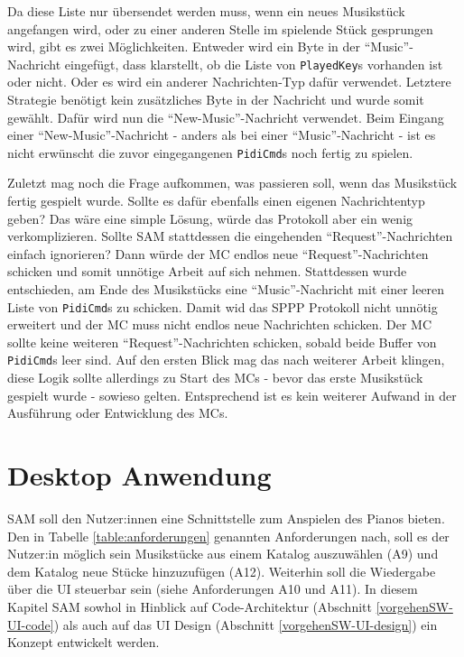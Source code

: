 Da diese Liste nur übersendet werden muss, wenn ein neues Musikstück angefangen wird, oder zu einer anderen Stelle im spielende Stück gesprungen wird, gibt es zwei Möglichkeiten.
Entweder wird ein Byte in der \enquote{Music}-Nachricht eingefügt, dass klarstellt, ob die Liste von \lstinline|PlayedKey|s vorhanden ist oder nicht.
Oder es wird ein anderer Nachrichten-Typ dafür verwendet.
Letztere Strategie benötigt kein zusätzliches Byte in der Nachricht und wurde somit gewählt.
Dafür wird nun die \enquote{New-Music}-Nachricht verwendet.
Beim Eingang einer \enquote{New-Music}-Nachricht - anders als bei einer \enquote{Music}-Nachricht - ist es nicht erwünscht die zuvor eingegangenen \lstinline|PidiCmd|s noch fertig zu spielen.

Zuletzt mag noch die Frage aufkommen, was passieren soll, wenn das Musikstück fertig gespielt wurde.
Sollte es dafür ebenfalls einen eigenen Nachrichtentyp geben?
Das wäre eine simple Lösung, würde das Protokoll aber ein wenig verkomplizieren.
Sollte \ac{SAM} stattdessen die eingehenden \enquote{Request}-Nachrichten einfach ignorieren?
Dann würde der \ac{MC} endlos neue \enquote{Request}-Nachrichten schicken und somit unnötige Arbeit auf sich nehmen.
Stattdessen wurde entschieden, am Ende des Musikstücks eine \enquote{Music}-Nachricht mit einer leeren Liste von \lstinline|PidiCmd|s zu schicken.
Damit wid das \ac{SPPP} Protokoll nicht unnötig erweitert und der \ac{MC} muss nicht endlos neue Nachrichten schicken.
Der \ac{MC} sollte keine weiteren \enquote{Request}-Nachrichten schicken, sobald beide Buffer von \lstinline|PidiCmd|s leer sind.
Auf den ersten Blick mag das nach weiterer Arbeit klingen, diese Logik sollte allerdings zu Start des \ac{MC}s - bevor das erste Musikstück gespielt wurde - sowieso gelten.
Entsprechend ist es kein weiterer Aufwand in der Ausführung oder Entwicklung des \ac{MC}s.



\section{Desktop Anwendung} \label{vorgehenSW-UI}

\ac{SAM} soll den Nutzer:innen eine Schnittstelle zum Anspielen des Pianos bieten.
Den in Tabelle \ref{table:anforderungen} genannten Anforderungen nach, soll es der Nutzer:in möglich sein Musikstücke aus einem Katalog auszuwählen (A9) und dem Katalog neue Stücke hinzuzufügen (A12).
Weiterhin soll die Wiedergabe über die \ac{UI} steuerbar sein (siehe Anforderungen A10 und A11). \newline
In diesem Kapitel \ac{SAM} sowhol in Hinblick auf Code-Architektur (Abschnitt \ref{vorgehenSW-UI-code}) als auch auf das \ac{UI} Design (Abschnitt \ref{vorgehenSW-UI-design}) ein Konzept entwickelt werden.


